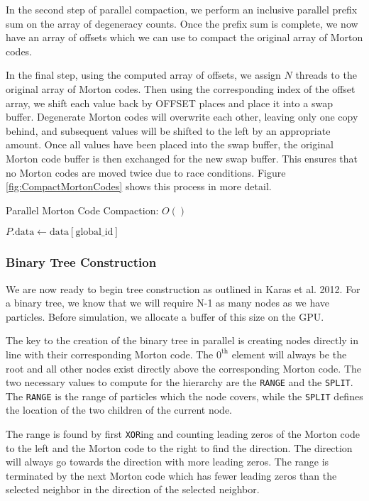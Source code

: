 \documentclass{thesis}
\begin{document}
In the second step of parallel compaction, we perform an inclusive parallel prefix sum on the array of degeneracy counts. Once the prefix sum is complete, we now have an array of offsets which we can use to compact the original array of Morton codes.

In the final step, using the computed array of offsets, we assign $N$ threads to the original array of Morton codes. Then using the corresponding index of the offset array, we shift each value back by OFFSET places and place it into a swap buffer. Degenerate Morton codes will overwrite each other, leaving only one copy behind, and subsequent values will be shifted to the left by an appropriate amount. Once all values have been placed into the swap buffer, the original Morton code buffer is then exchanged for the new swap buffer. This ensures that no Morton codes are moved twice due to race conditions. Figure \ref{fig:CompactMortonCodes} shows this process in more detail.
\begin{algorithm}
    \label{alg:ParallelCompaction}
    \caption{Parallel Morton Code Compaction: $O()$}
    \begin{algorithmic}
            $P.\text{data} \gets \text{data}[\text{global\_id}]$
        \EndFor
    \end{algorithmic}
\end{algorithm}
\subsubsection{Binary Tree Construction}
We are now ready to begin tree construction as outlined in Karas et al. 2012. For a binary tree, we know that we will require N-1 as many nodes as we have particles. Before simulation, we allocate a buffer of this size on the GPU.

The key to the creation of the binary tree in parallel is creating nodes directly in line with their corresponding  Morton code. The $\text{0}^\text{th}$ element will always be the root and all other nodes exist directly above the corresponding  Morton code. The two necessary values to compute for the hierarchy are the \texttt{RANGE} and the \texttt{SPLIT}. The \texttt{RANGE} is the range of particles which the node covers, while the \texttt{SPLIT} defines the location of the two children of the current node. 

The range is found by first \texttt{XOR}ing and counting leading zeros of the Morton code to the left and the Morton code to the right to find the direction. The direction will always go towards the direction with more leading zeros. The range is terminated by the next Morton code which has fewer leading zeros than the selected neighbor in the direction of the selected neighbor. 
\end{document}
